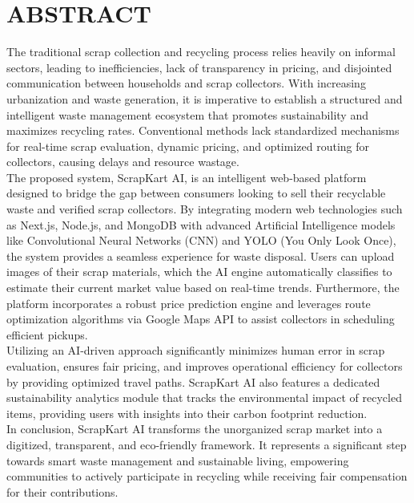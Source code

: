 \newpage
\chapter*{ABSTRACT}
\thispagestyle{empty}

\vspace{1cm}

The traditional scrap collection and recycling process relies heavily on informal sectors, leading to inefficiencies, lack of transparency in pricing, and disjointed communication between households and scrap collectors. With increasing urbanization and waste generation, it is imperative to establish a structured and intelligent waste management ecosystem that promotes sustainability and maximizes recycling rates. Conventional methods lack standardized mechanisms for real-time scrap evaluation, dynamic pricing, and optimized routing for collectors, causing delays and resource wastage.\\

\noindent The proposed system, ScrapKart AI, is an intelligent web-based platform designed to bridge the gap between consumers looking to sell their recyclable waste and verified scrap collectors. By integrating modern web technologies such as Next.js, Node.js, and MongoDB with advanced Artificial Intelligence models like Convolutional Neural Networks (CNN) and YOLO (You Only Look Once), the system provides a seamless experience for waste disposal. Users can upload images of their scrap materials, which the AI engine automatically classifies to estimate their current market value based on real-time trends. Furthermore, the platform incorporates a robust price prediction engine and leverages route optimization algorithms via Google Maps API to assist collectors in scheduling efficient pickups.\\

\noindent Utilizing an AI-driven approach significantly minimizes human error in scrap evaluation, ensures fair pricing, and improves operational efficiency for collectors by providing optimized travel paths. ScrapKart AI also features a dedicated sustainability analytics module that tracks the environmental impact of recycled items, providing users with insights into their carbon footprint reduction.\\

\noindent In conclusion, ScrapKart AI transforms the unorganized scrap market into a digitized, transparent, and eco-friendly framework. It represents a significant step towards smart waste management and sustainable living, empowering communities to actively participate in recycling while receiving fair compensation for their contributions.\\

